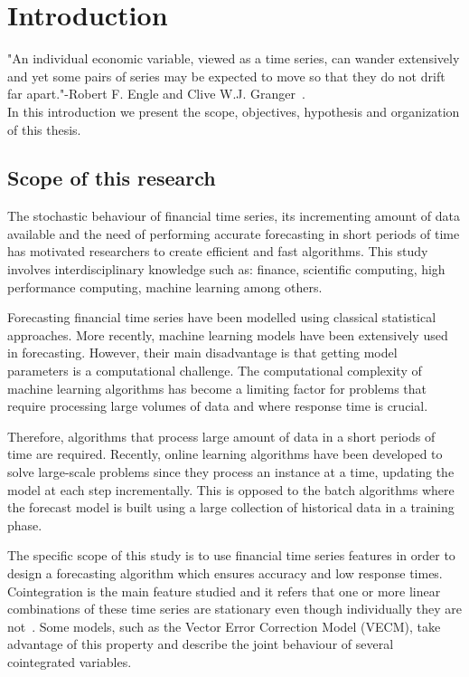 \chapter{Introduction}\label{ch:introduction}

\vspace{0.5cm} 

"An individual economic variable, viewed as a time series, can wander extensively
and yet some pairs of series may be expected to move so that they do not drift
far apart."-Robert F. Engle and Clive W.J. Granger~\cite{engle1987}.\\
In this introduction we present the scope, objectives, hypothesis and
organization of this thesis.


\section{Scope of this research}

The stochastic behaviour of financial time series, its incrementing
amount of data available and the need of performing accurate forecasting in
short periods of time has motivated researchers to create efficient and fast
algorithms. This study involves interdisciplinary knowledge such as: finance,
scientific computing, high performance computing, machine learning
among others.

Forecasting financial time series have been modelled using classical statistical
approaches. More recently, machine learning models have been extensively used in
forecasting. However, their main disadvantage is that getting model parameters
is a computational challenge.  The computational complexity of machine learning
algorithms has become a limiting factor for problems that require processing
large volumes of data and where response time is crucial.

Therefore, algorithms that process large amount of data in a short periods of
time are required. Recently, online learning algorithms have been developed to solve
large-scale problems since they process an instance at a time, updating the
model at each step incrementally. This is opposed to the batch algorithms where
the forecast model is built using a large collection of historical data in
a training phase.

The specific scope of this study is to use financial time series features in
order to design a forecasting algorithm which ensures accuracy and low response
times. Cointegration is the main feature studied and it refers that one or more
linear combinations of these time series are stationary even though individually
they are not~\cite{engle87}.  Some models, such as the Vector Error Correction Model
(VECM), take advantage of this property and describe the joint behaviour of
several cointegrated variables.

